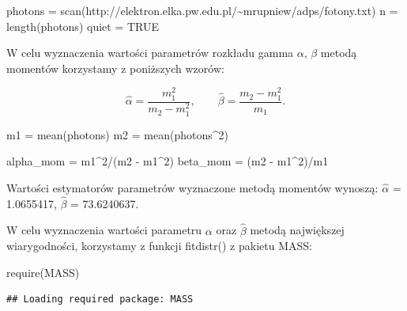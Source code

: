 \documentclass[
]{article}
\newenvironment{Shaded}{\begin{snugshade}}{\end{snugshade}}
\newcommand{\ConstantTok}[1]{\textcolor[rgb]{0.00,0.00,0.00}{#1}}
\newcommand{\DecValTok}[1]{\textcolor[rgb]{0.00,0.00,0.81}{#1}}
\newcommand{\FunctionTok}[1]{\textcolor[rgb]{0.00,0.00,0.00}{#1}}
\newcommand{\NormalTok}[1]{#1}
\newcommand{\OtherTok}[1]{\textcolor[rgb]{0.56,0.35,0.01}{#1}}
\newcommand{\SpecialCharTok}[1]{\textcolor[rgb]{0.00,0.00,0.00}{#1}}
\newcommand{\StringTok}[1]{\textcolor[rgb]{0.31,0.60,0.02}{#1}}
\begin{document}
\begin{Shaded}
\begin{Highlighting}[]
\NormalTok{photons }\OtherTok{=} \FunctionTok{scan}\NormalTok{(}\StringTok{\textquotesingle{}http://elektron.elka.pw.edu.pl/\textasciitilde{}mrupniew/adps/fotony.txt\textquotesingle{}}\NormalTok{)}
\NormalTok{n }\OtherTok{=} \FunctionTok{length}\NormalTok{(photons)}
\NormalTok{quiet }\OtherTok{=} \ConstantTok{TRUE} 
\end{Highlighting}
\end{Shaded}

W celu wyznaczenia wartości parametrów rozkładu gamma \(\alpha\),
\(\beta\) metodą momentów korzystamy z poniższych wzorów:

\[ \hat{\alpha} = \frac{m_{1}^{2}}{m_2-m_{1}^{2}}, \qquad \hat{\beta} = \frac{m_2-m_{1}^{2}}{m_{1}}.\]

\begin{Shaded}
\begin{Highlighting}[]
\NormalTok{m1 }\OtherTok{=} \FunctionTok{mean}\NormalTok{(photons)}
\NormalTok{m2 }\OtherTok{=} \FunctionTok{mean}\NormalTok{(photons}\SpecialCharTok{\^{}}\DecValTok{2}\NormalTok{)}

\NormalTok{alpha\_mom }\OtherTok{=}\NormalTok{ m1}\SpecialCharTok{\^{}}\DecValTok{2}\SpecialCharTok{/}\NormalTok{(m2 }\SpecialCharTok{{-}}\NormalTok{ m1}\SpecialCharTok{\^{}}\DecValTok{2}\NormalTok{)}
\NormalTok{beta\_mom }\OtherTok{=}\NormalTok{ (m2 }\SpecialCharTok{{-}}\NormalTok{ m1}\SpecialCharTok{\^{}}\DecValTok{2}\NormalTok{)}\SpecialCharTok{/}\NormalTok{m1}
\end{Highlighting}
\end{Shaded}

Wartości estymatorów parametrów wyznaczone metodą momentów wynoszą:
\(\hat{\alpha}\) = 1.0655417, \(\hat{\beta}\) = 73.6240637.

W celu wyznaczenia wartości parametru \(\alpha\) oraz \(\hat{\beta}\)
metodą największej wiarygodności, korzystamy z funkcji fitdistr() z
pakietu MASS:

\begin{Shaded}
\begin{Highlighting}[]
\FunctionTok{require}\NormalTok{(MASS)}
\end{Highlighting}
\end{Shaded}

\begin{verbatim}
## Loading required package: MASS
\end{verbatim}
\end{document}
